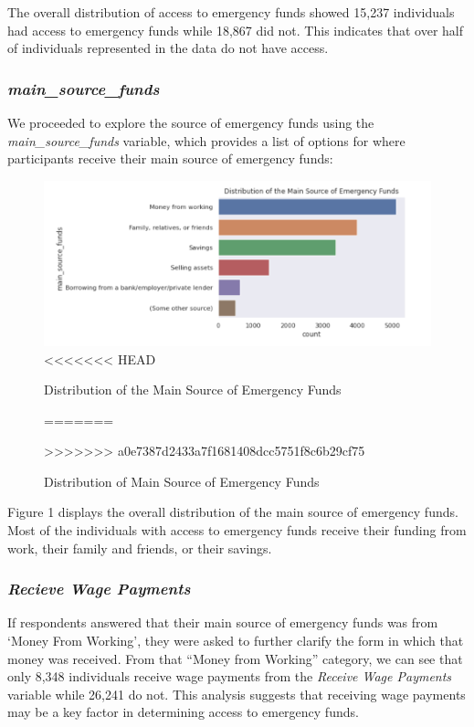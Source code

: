 \documentclass[water,article,submit,moreauthors,pdftex]{mdpi}
\begin{document}
The overall distribution of access to emergency funds showed 15,237
individuals had access to emergency funds while 18,867 did not. This
indicates that over half of individuals represented in the data do not
have access.

\hypertarget{main_source_funds}{%
\subsubsection{\texorpdfstring{\emph{main\_source\_funds}}{main\_source\_funds}}\label{main_source_funds}}

We proceeded to explore the source of emergency funds using the
\emph{main\_source\_funds} variable, which provides a list of options
for where participants receive their main source of emergency funds:

\begin{figure}
\centering
\includegraphics[width=\textwidth,height=0.5\textheight]{images/MainSourceFunds.png}
<<<<<<< HEAD
\caption{Distribution of the Main Source of Emergency Funds}
=======
\caption{Distribution of Main Source of Emergency Funds}
>>>>>>> a0e7387d2433a7f1681408dcc5751f8c6b29cf75
\end{figure}

Figure 1 displays the overall distribution of the main source of
emergency funds. Most of the individuals with access to emergency funds
receive their funding from work, their family and friends, or their
savings.

\hypertarget{recieve-wage-payments}{%
\subsubsection{\texorpdfstring{\emph{Recieve Wage
Payments}}{Recieve Wage Payments}}\label{recieve-wage-payments}}

If respondents answered that their main source of emergency funds was
from `Money From Working', they were asked to further clarify the form
in which that money was received. From that ``Money from Working''
category, we can see that only 8,348 individuals receive wage payments
from the \emph{Receive Wage Payments} variable while 26,241 do not. This
analysis suggests that receiving wage payments may be a key factor in
determining access to emergency funds.
\end{document}
